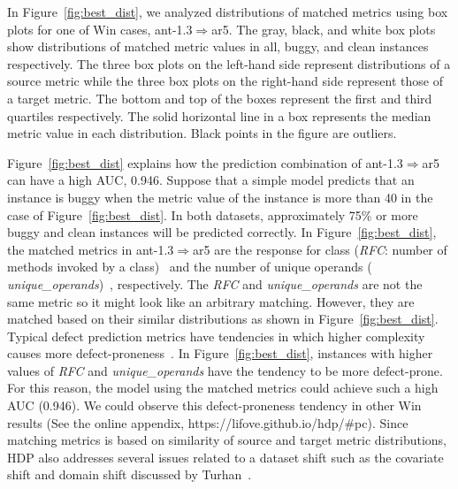 In Figure~\ref{fig:best_dist}, we analyzed distributions of matched metrics using box plots for one of Win cases, ant-1.3$\Rightarrow$ar5.
The gray, black, and white box plots show distributions of matched metric values in
all, buggy, and clean instances respectively. The three box plots on the
left-hand side represent distributions of a source metric while the three
box plots on the right-hand side represent those of a target metric. The
bottom and top of the boxes represent the first and third quartiles
respectively.
The solid horizontal line in a box represents the median metric value in each distribution.
Black points in the figure are outliers.

Figure~\ref{fig:best_dist} explains how the prediction
combination of ant-1.3$\Rightarrow$ar5 can have a high AUC, 0.946. Suppose
that a simple model predicts that an instance is buggy when the metric value of
the instance is more than 40 in the case of Figure~\ref{fig:best_dist}. In both
datasets, approximately 75\% or more buggy and clean instances will be
predicted correctly. In Figure~\ref{fig:best_dist}, the matched metrics in
ant-1.3$\Rightarrow$ar5 are the response for class ({\em RFC}: number of methods
invoked by a class)~\cite{Chidamber94} and the number of unique operands ({\em
unique\_operands})~\cite{Halstead77}, respectively. The {\em RFC} and {\em
unique\_operands} are not the same metric so it might look like an arbitrary
matching. However, they are matched based on their similar distributions as
shown in Figure~\ref{fig:best_dist}. Typical defect prediction metrics have
tendencies in which higher complexity causes more
defect-proneness~\cite{DAmbros12,Menzies07,Rahman13}. In
Figure~\ref{fig:best_dist}, instances with higher values of {\em RFC} and {\em
unique\_operands} have the tendency to be more defect-prone. For this reason, the
model using the matched metrics could achieve such a high AUC (0.946). We could
observe this defect-proneness tendency in other Win results (See the online appendix, https://lifove.github.io/hdp/\#pc). Since matching metrics is
based on similarity of source and target metric distributions, HDP also
addresses several issues related to a dataset shift such as the covariate shift
and domain shift discussed by Turhan~\cite{Turhan12}.



